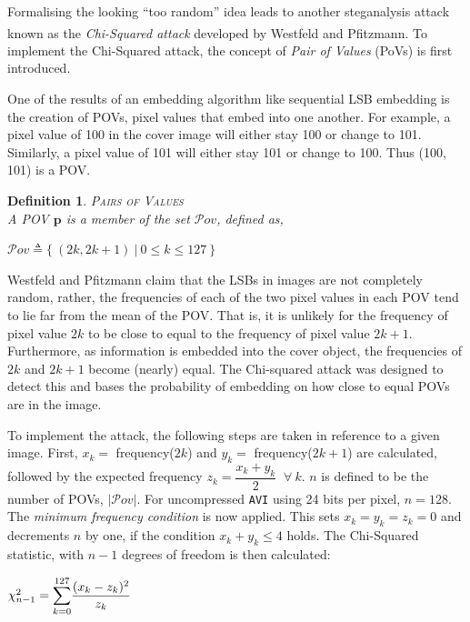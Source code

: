 \documentclass[paper=a4, fontsize=11pt,twoside]{scrartcl}
\numberwithin{table}{section}
\numberwithin{figure}{section}
\numberwithin{algorithm}{section}
\newtheorem{ddef}{Definition}[section]
\begin{document}
Formalising the looking ``too random'' idea leads to another steganalysis attack known as the \textit{Chi-Squared attack} developed by Westfeld and Pfitzmann\textsuperscript{\cite{chi}}. To implement the Chi-Squared attack, the concept of \textit{Pair of Values} (PoVs) is first introduced.

One of the results of an embedding algorithm like sequential LSB embedding is the creation of POVs, pixel values that embed into one another. For example, a pixel value of 100 in the cover image will either stay 100 or change to 101. Similarly, a pixel value of 101 will either stay 101 or change to 100. Thus (100, 101) is a POV. 

\begin{ddef}
\textsc{Pairs of Values}\\[5pt]
A POV $\textbf{p}$ is a member of the set $\mathcal{P}ov$, defined as,
\begin{center}
$\mathcal{P}ov \triangleq \{~(2k, 2k + 1) ~\vert ~ 0 \leq k \leq 127 ~\}$
\end{center}
\end{ddef}

\noindent
Westfeld and Pfitzmann claim that the LSBs in images are not completely random, rather, the frequencies of each of the two pixel values in each POV tend to lie far from the mean of the POV. That is, it is unlikely for the frequency of pixel value $2k$ to be close to equal to the frequency of pixel value $2k+1$. Furthermore, as information is embedded into the cover object, the frequencies of $2k$ and $2k+1$ become (nearly) equal. The Chi-squared attack was designed to detect this and bases the probability of embedding on how close to equal POVs are in the image.

To implement the attack, the following steps are taken in reference to a given image. First, $x_{k} =$ frequency($2k$) and $y_{k} =$ frequency($2k+1$) are calculated, followed by the expected frequency $z_{k} = \dfrac{x_{k} + y_{k}}{2}$ $~\forall ~k$. $n$ is defined to be the number of POVs, $\vert \mathcal{P}ov \vert$. For uncompressed \texttt{AVI} using 24 bits per pixel, $n=128$. The \textit{minimum frequency condition} is now applied. This sets $x_{k} = y_{k} = z_{k} = 0$ and decrements $n$ by one, if the condition $x_{k} + y_{k} \leq 4$ holds. The Chi-Squared statistic, with $n - 1$ degrees of freedom is then calculated:
\begin{center}
$\chi ^{2} _{n-1} = \mathlarger{\sum}\limits_{k=0}^{127} \dfrac{(x_{k} - z_{k})^2}{z_{k}}$
\end{center}
\end{document}
